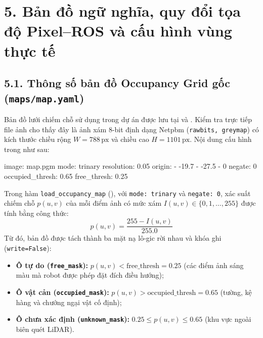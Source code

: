 \section*{5. Bản đồ ngữ nghĩa, quy đổi tọa độ Pixel--ROS và cấu hình vùng thực tế}

\subsection*{5.1. Thông số bản đồ Occupancy Grid gốc (\texttt{maps/map.yaml})}

Bản đồ lưới chiếm chỗ sử dụng trong dự án được lưu tại  và . Kiểm tra trực tiếp file ảnh  cho thấy đây là ảnh xám 8-bit định dạng Netpbm (\texttt{rawbits, greymap}) có kích thước chiều rộng $W = 788\,\text{px}$ và chiều cao $H = 1101\,\text{px}$. Nội dung cấu hình trong  như sau:

\begin{svcode}
image: map.pgm
mode: trinary
resolution: 0.05
origin:
- -19.7
- -27.5
- 0
negate: 0
occupied_thresh: 0.65
free_thresh: 0.25
\end{svcode}

Trong hàm \texttt{load\_occupancy\_map} (), với \texttt{mode: trinary} và \texttt{negate: 0}, xác suất chiếm chỗ $p(u, v)$ của mỗi điểm ảnh có mức xám $I(u, v) \in \{0, 1, \dots, 255\}$ được tính bằng công thức:
\begin{equation}
  p(u, v) = \frac{255 - I(u, v)}{255.0}
\end{equation}
Từ đó, bản đồ được tách thành ba mặt nạ lô-gic rời nhau và khóa ghi (\texttt{write=False}):
\begin{itemize}[leftmargin=1.2cm]
  \item \textbf{Ô tự do (\texttt{free\_mask}):} $p(u, v) < \text{free\_thresh} = 0.25$ (các điểm ảnh sáng màu mà robot được phép đặt đích điều hướng);
  \item \textbf{Ô vật cản (\texttt{occupied\_mask}):} $p(u, v) > \text{occupied\_thresh} = 0.65$ (tường, kệ hàng và chướng ngại vật cố định);
  \item \textbf{Ô chưa xác định (\texttt{unknown\_mask}):} $0.25 \le p(u, v) \le 0.65$ (khu vực ngoài biên quét LiDAR).
\end{itemize}

